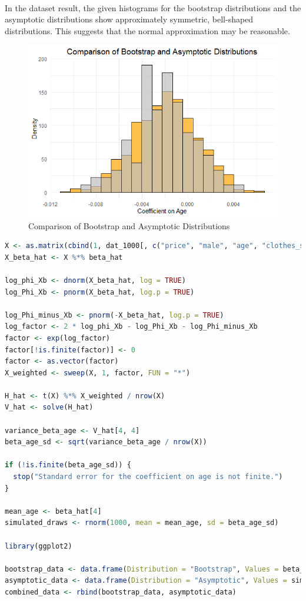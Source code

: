 \documentclass[a4paper,12pt]{article} %
\theoremstyle{nonitalic}
\newenvironment{solution}[1]
  {\renewcommand\theinnercustomsol{#1}\innercustomsol}
  {\endinnercustomsol}
\newcounter{solutionctr}[section]
\renewcommand{\thesolutionctr}{(\alph{solutionctr})}
\newenvironment{autosolution}
  {\stepcounter{solutionctr}\begin{solution}{\thesolutionctr}}
  {\end{solution}}
\begin{document}
\pagebreak
\begin{autosolution}
    \

    In the dataset result, the given histograms for the bootstrap distributions and the asymptotic distributions show approximately symmetric, bell-shaped distributions. 
    This suggests that the normal approximation may be reasonable.

    \begin{figure}[!htbp]
        \centering
        \includegraphics[width=0.5\linewidth]{h.png}
        \caption{Comparison of Bootstrap and Asymptotic Distributions}
        \label{fig:h}
    \end{figure}

    \begin{lstlisting}[language=R]
X <- as.matrix(cbind(1, dat_1000[, c("price", "male", "age", "clothes_shoes", "cosmetics", "food", "technology")]))
X_beta_hat <- X %*% beta_hat

log_phi_Xb <- dnorm(X_beta_hat, log = TRUE)
log_Phi_Xb <- pnorm(X_beta_hat, log.p = TRUE)

log_Phi_minus_Xb <- pnorm(-X_beta_hat, log.p = TRUE)
log_factor <- 2 * log_phi_Xb - log_Phi_Xb - log_Phi_minus_Xb
factor <- exp(log_factor)
factor[!is.finite(factor)] <- 0
factor <- as.vector(factor)
X_weighted <- sweep(X, 1, factor, FUN = "*")

H_hat <- t(X) %*% X_weighted / nrow(X)
V_hat <- solve(H_hat)

variance_beta_age <- V_hat[4, 4]
beta_age_sd <- sqrt(variance_beta_age / nrow(X))

if (!is.finite(beta_age_sd)) {
  stop("Standard error for the coefficient on age is not finite.")
}

mean_age <- beta_hat[4]
simulated_draws <- rnorm(1000, mean = mean_age, sd = beta_age_sd)

library(ggplot2)

bootstrap_data <- data.frame(Distribution = "Bootstrap", Values = beta_age_bootstrap)
asymptotic_data <- data.frame(Distribution = "Asymptotic", Values = simulated_draws)
combined_data <- rbind(bootstrap_data, asymptotic_data)


\end{lstlisting}
\end{autosolution}
\end{document}
